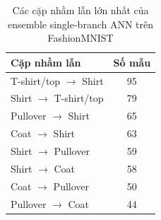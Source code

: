 \begin{table}[H]
\centering
\caption{Các cặp nhầm lẫn lớn nhất của ensemble single-branch ANN trên FashionMNIST}
\label{tab:fashion-mnist-ensemble-top-errors}
\begin{tabular}{l c}
\toprule
Cặp nhầm lẫn & Số mẫu \\
\midrule
T-shirt/top $\rightarrow$ Shirt & 95 \\
Shirt $\rightarrow$ T-shirt/top & 79 \\
Pullover $\rightarrow$ Shirt & 65 \\
Coat $\rightarrow$ Shirt & 63 \\
Shirt $\rightarrow$ Pullover & 59 \\
Shirt $\rightarrow$ Coat & 58 \\
Coat $\rightarrow$ Pullover & 50 \\
Pullover $\rightarrow$ Coat & 44 \\
\bottomrule
\end{tabular}
\end{table}
